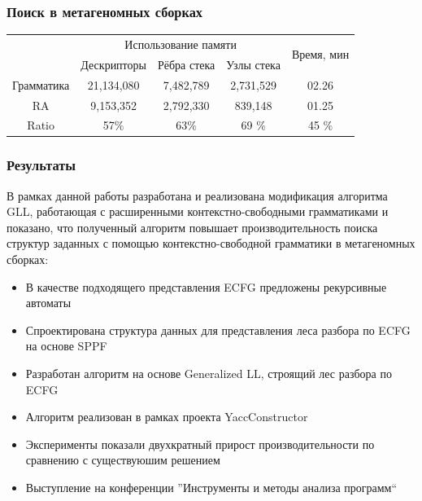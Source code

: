 \documentclass{beamer}
\begin{document}
	\begin{frame} 
		\frametitle{Поиск в метагеномных сборках} 
		\begin{center}
		\vspace{40pt}
		\begin{tabular}{ | c | c | c | c | c | }
			\hline
			\multirow{2}{*}[-1ex]{} &\multicolumn{3}{c|}{Использование памяти} & \multirow{2}{*}[-1ex]{Время, мин } \\
			\cline{2-4}
			             &  Дескрипторы & Рёбра стека & Узлы стека &   \\ \hline
			Грамматика  &  21,134,080       & 7,482,789      & 2,731,529      & 02.26  \\ \hline
			RA &  9,153,352        &  2,792,330     & 839,148        & 01.25  \\ \hline \hline
			Ratio   &  57$\%$       & 63$\%$     & 69 $\%$    &  45 $\%$ \\ \hline
		\end{tabular}
		\end{center}
	\end{frame}

	\begin{frame} 
		\frametitle{Результаты}
		В рамках данной работы разработана и реализована модификация алгоритма GLL,
		работающая с расширенными контекстно-свободными грамматиками и показано, что полученный
		алгоритм повышает производительность поиска структур заданных с помощью контекстно-свободной
		грамматики в метагеномных сборках:
		\begin{itemize}
			\item В качестве подходящего представления ECFG предложены рекурсивные автоматы
			\item Спроектирована структура данных для представления леса разбора по ECFG на основе SPPF
			\item Разработан алгоритм на основе Generalized LL, строящий лес разбора по ECFG
			\item Алгоритм реализован в рамках проекта YaccConstructor
			\item Эксперименты показали двухкратный прирост производительности по сравнению с существуюшим решением 
			\item Выступление на конференции ''Инструменты и методы анализа программ``
		\end{itemize}		
	\end{frame}
\end{document}
